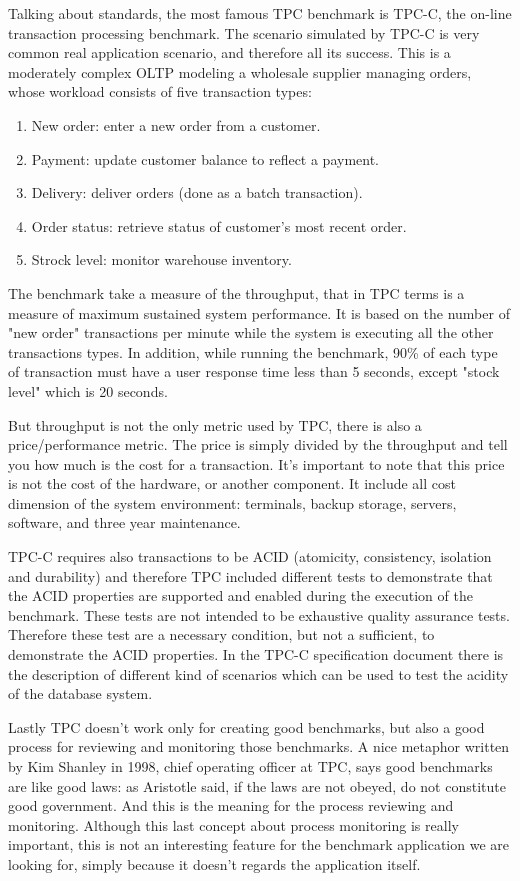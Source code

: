 Talking about standards, the most famous TPC benchmark is TPC-C, the on-line transaction processing benchmark. The scenario simulated by TPC-C is very common real application scenario, and therefore all its success. This is a moderately complex OLTP modeling a wholesale supplier managing orders, whose workload consists of five transaction types:
\begin{enumerate}
	\item New order: enter a new order  from a customer.
	\item Payment: update customer balance to reflect a payment.
	\item Delivery: deliver orders (done as a batch transaction).
	\item Order status: retrieve status of customer's most recent order.
	\item Strock level: monitor warehouse inventory.
\end{enumerate}
The benchmark take a measure of the throughput, that in TPC terms is a measure of maximum sustained system performance. It is based on the number of "new order" transactions per minute while the system is executing all the other transactions types. In addition, while running the benchmark, 90\% of each type of transaction must have a user response time less than 5 seconds, except "stock level" which is 20 seconds.

But throughput is not the only metric used by TPC, there is also a price/performance metric. The price is simply divided by the throughput and tell you how much is the cost for a transaction. It's important to note that this price is not the cost of the hardware, or another component. It include all cost dimension of the system environment: terminals, backup storage, servers, software, and three year maintenance.

TPC-C requires also transactions to be ACID (atomicity, consistency, isolation and durability) and therefore TPC included different tests to demonstrate that the ACID properties are supported and enabled during the execution of the benchmark. These tests are not intended to be exhaustive quality assurance tests. Therefore these test are a necessary condition, but not a sufficient, to demonstrate the ACID properties. In the TPC-C specification document \cite{TPC-C} there is the description of different kind of scenarios which can be used to test the acidity of the database system.

Lastly TPC doesn't work only for creating good benchmarks, but also a good process for reviewing and monitoring those benchmarks. A nice metaphor written by Kim Shanley in 1998, chief operating officer at TPC, says good benchmarks are like good laws: as Aristotle said, if the laws are not obeyed, do not constitute good government. And this is the meaning for the process reviewing and monitoring. Although this last concept about process monitoring is really important, this is not an interesting feature for the benchmark application we are looking for, simply because it doesn't regards the application itself.

